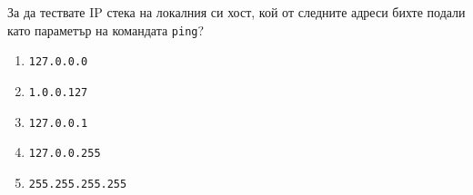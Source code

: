 \begin{q}
  За да тествате IP стека на локалния си хост, кой от следните адреси бихте
  подали като параметър на командата \texttt{ping}?
  \begin{enumerate}
  \item \texttt{127.0.0.0}
  \item \texttt{1.0.0.127}
  \item \texttt{127.0.0.1}
  \item \texttt{127.0.0.255}
  \item \texttt{255.255.255.255}
  \end{enumerate}
\end{q}